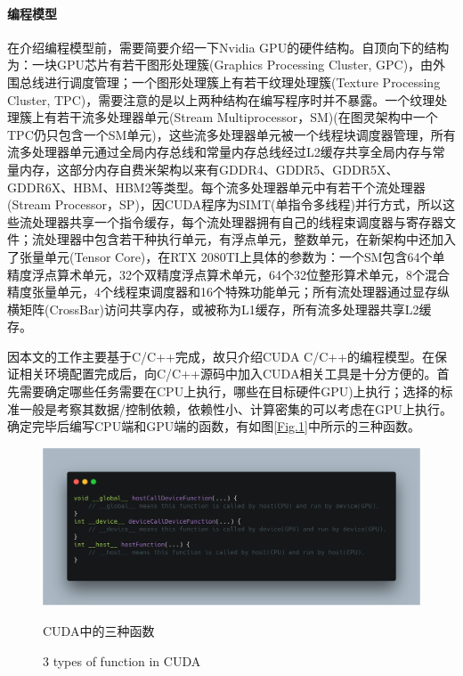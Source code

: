 \paragraph{编程模型}
\par 在介绍编程模型前，需要简要介绍一下Nvidia GPU的硬件结构。自顶向下的结构为：一块GPU芯片有若干图形处理簇(Graphics Processing Cluster, GPC)，由外围总线进行调度管理；一个图形处理簇上有若干纹理处理簇(Texture Processing Cluster, TPC)，需要注意的是以上两种结构在编写程序时并不暴露。一个纹理处理簇上有若干流多处理器单元(Stream Multiprocessor，SM)(在图灵架构中一个TPC仍只包含一个SM单元)，这些流多处理器单元被一个线程块调度器管理，所有流多处理器单元通过全局内存总线和常量内存总线经过L2缓存共享全局内存与常量内存，这部分内存自费米架构以来有GDDR4、GDDR5、GDDR5X、GDDR6X、HBM、HBM2等类型。每个流多处理器单元中有若干个流处理器(Stream Processor，SP)，因CUDA程序为SIMT(单指令多线程)并行方式，所以这些流处理器共享一个指令缓存，每个流处理器拥有自己的线程束调度器与寄存器文件；流处理器中包含若干种执行单元，有浮点单元，整数单元，在新架构中还加入了张量单元(Tensor Core)，在RTX 2080TI上具体的参数为：一个SM包含64个单精度浮点算术单元，32个双精度浮点算术单元，64个32位整形算术单元，8个混合精度张量单元，4个线程束调度器和16个特殊功能单元；所有流处理器通过显存纵横矩阵(CrossBar)访问共享内存，或被称为L1缓存\parencite{EXPLORING}，所有流多处理器共享L2缓存。
\par 因本文的工作主要基于C/C++完成，故只介绍CUDA C/C++的编程模型。在保证相关环境配置完成后，向C/C++源码中加入CUDA相关工具是十分方便的。首先需要确定哪些任务需要在CPU上执行，哪些在目标硬件GPU)上执行；选择的标准一般是考察其数据/控制依赖，依赖性小、计算密集的可以考虑在GPU上执行。确定完毕后编写CPU端和GPU端的函数，有如图\ref{Fig.1}中所示的三种函数。
\begin{figure}
	\centering
	\includegraphics[width=15cm]{figures/CODE1.png}
	\renewcommand{\thefigure}{\arabic{section}-\arabic{figure} }
	\renewcommand{\figurename}{图}
	\caption{CUDA中的三种函数}
	\addtocounter{figure}{-1}
	\renewcommand{\thefigure}{\arabic{section}-\arabic{figure} }
	\renewcommand{\figurename}{Figure}
	\caption{3 types of function in CUDA}
	\label{Fig.2}
\end{figure}
